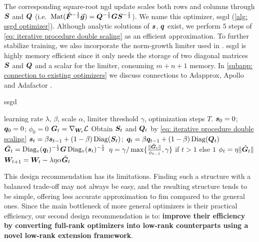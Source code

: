 The corresponding square-root \gls{ngd} update scales both rows and columns through ${\bm{S}}$ and ${\bm{Q}}$ (i.e.~$\operatorname{Mat}(\tilde{\bm{F}}^{-\frac{1}{2}}\vec{\bm{g}}) = {\bm{Q}}^{-\frac{1}{2}}{\bm{G}}{\bm{S}}^{-\frac{1}{2}}$).
We name this optimizer, \gls{ssgd} (\cref{alg: ssgd optimizer}). Although analytic solutions of ${\bm{s}}$, ${\bm{q}}$ exist, we perform $5$ steps of \cref{eq: iterative procedure double scaling} as an efficient approximation. To further stabilize training, we also incorporate the norm-growth limiter used in \citet{chen2024fira}. \gls{ssgd} is highly memory efficient since it only needs the storage of two diagonal matrices ${\bm{S}}$ and ${\bm{Q}}$ and a scalar for the limiter, consuming $m+n+1$ memory. In \cref{subapp: connection to existing optimizers} we discuss  connections to Adapprox, Apollo and Adafactor \citep{zhao2024adapprox, zhu2024apollo, shazeer2018adafactor}.
\begin{algorithm}
    \caption{\gls{ssgd}}
    \label{alg: ssgd optimizer}
    \begin{algorithmic}[1]
         learning rate $\lambda$, $\beta$, scale $\alpha$, limiter threshold $\gamma$, optimization steps $T$.
        \STATE ${\bm{s}}_0 = 0$; ${\bm{q}}_0=0$; $\phi_0=0$
            \STATE ${\bm{G}}_t=\nabla_{{\bm{W}}_t}\mathcal{L}$
            \STATE Obtain ${\bm{S}}_t$ and ${\bm{Q}}_t$ by \cref{eq: iterative procedure double scaling}
            \STATE ${\bm{s}}_t=\beta{\bm{s}}_{t-1}+(1-\beta)\operatorname{Diag}({\bm{S}}_t)$; 
            \STATE ${\bm{q}}_t=\beta{\bm{q}}_{t-1}+(1-\beta)\operatorname{Diag}({\bm{Q}}_t)$
            \STATE$\tilde{{\bm{G}}}_t= \operatorname{Diag_v}({\bm{q}}_t)^{-\frac{1}{2}}{\bm{G}}\operatorname{Diag_v}({\bm{s}}_t)^{-\frac{1}{2}}$
            \STATE $\eta =\gamma/\max\{\frac{\Vert\tilde{{\bm{G}}}_t\Vert}{\phi_{t-1}}, \gamma\}$ if $t>1$ else $1$ 
            \STATE $\phi_t = \eta\Vert\tilde{{\bm{G}}}_t\Vert$
            \STATE ${\bm{W}}_{t+1}={\bm{W}}_t -\lambda\eta \alpha\tilde{{\bm{G}}}_t$
        \ENDFOR
    \end{algorithmic}
\end{algorithm}

This design recommendation has its limitations. Finding such a structure with a balanced trade-off may not always be easy, and the resulting structure tends to be simple, offering less accurate approximation to \gls{fim} compared to the general ones. Since the main bottleneck of more general optimizers is their practical efficiency, our second design recommendation is to: \textbf{improve their efficiency by converting full-rank optimizers into low-rank counterparts using a novel low-rank extension framework}.